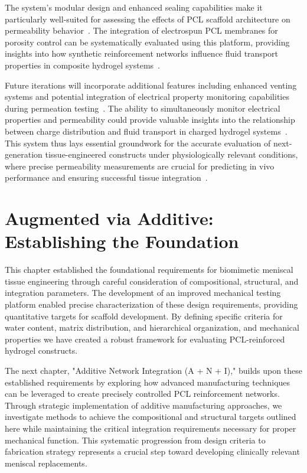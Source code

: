 The system's modular design and enhanced sealing capabilities make it particularly well-suited for assessing the effects of PCL scaffold architecture on permeability behavior~\cite{zhang20173dprintedpolyecaprolactone}. The integration of electrospun PCL membranes for porosity control can be systematically evaluated using this platform, providing insights into how synthetic reinforcement networks influence fluid transport properties in composite hydrogel systems~\cite{gao2018electrospunfiber}.

Future iterations will incorporate additional features including enhanced venting systems and potential integration of electrical property monitoring capabilities during permeation testing~\cite{woodruff2010returnforgotten}. The ability to simultaneously monitor electrical properties and permeability could provide valuable insights into the relationship between charge distribution and fluid transport in charged hydrogel systems~\cite{ahmed2015hydrogelpreparation}. This system thus lays essential groundwork for the accurate evaluation of next-generation tissue-engineered constructs under physiologically relevant conditions, where precise permeability measurements are crucial for predicting in vivo performance and ensuring successful tissue integration~\cite{kleinhans2018hydraulicpermeability}.

\section{Augmented via Additive: \protect\\ Establishing the Foundation}

This chapter established the foundational requirements for biomimetic meniscal tissue engineering through careful consideration of compositional, structural, and integration parameters. The development of an improved mechanical testing platform enabled precise characterization of these design requirements, providing quantitative targets for scaffold development. By defining specific criteria for water content, matrix distribution, and hierarchical organization, and mechanical properties we have created a robust framework for evaluating PCL-reinforced hydrogel constructs.

The next chapter, "Additive Network Integration (A + N + I)," builds upon these established requirements by exploring how advanced manufacturing techniques can be leveraged to create precisely controlled PCL reinforcement networks. Through strategic implementation of additive manufacturing approaches, we investigate methods to achieve the compositional and structural targets outlined here while maintaining the critical integration requirements necessary for proper mechanical function. This systematic progression from design criteria to fabrication strategy represents a crucial step toward developing clinically relevant meniscal replacements.